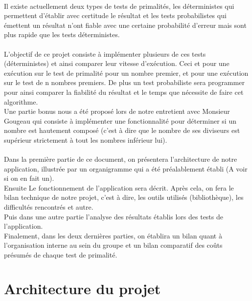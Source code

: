 	\paragraph{}Il existe actuellement deux types de tests de primalités, les déterministes qui permettent d'établir avec certitude le résultat et les tests probabilistes qui émettent un résultat n'ont fiable avec une certaine probabilité d'erreur mais sont plus rapide que les tests déterministes.
	
	\paragraph{}L'objectif de ce projet consiste à implémenter plusieurs de ces tests (déterministes) et ainsi comparer leur vitesse  d'exécution. Ceci et pour une exécution sur le test de primalité pour un nombre premier, et pour une exécution sur le test de n nombres premiers. De plus un test probabiliste sera programmer pour ainsi comparer la fiabilité du résultat et le temps que nécessite de faire cet algorithme.\\ 
	Une partie bonus nous a été proposé lors de notre entretient avec Monsieur Gougeau qui consiste à implémenter une fonctionnalité pour déterminer si un nombre est hautement composé (c'est à dire que le nombre de ses diviseurs est supérieur strictement à tout les nombres inférieur lui). 
	
	\paragraph{}Dans la première partie de ce document, on présentera l'architecture de notre application, illustrée par un organigramme qui a été préalablement établi (A voir si on en fait un).\\
	Ensuite Le fonctionnement de l'application sera décrit.
	Après cela, on fera le bilan technique de notre projet, c'est à dire, les outils utilisés (bibliothèque), les difficultés rencontrés et autre.\\
	Puis dans une autre partie l'analyse des résultats établis lors des tests de l'application.\\
	Finalement, dans les deux dernières parties, on établira un bilan quant à l'organisation interne au sein du groupe et un bilan comparatif des coûts présumés de chaque test de primalité.
	
		
	\section{Architecture du projet}
